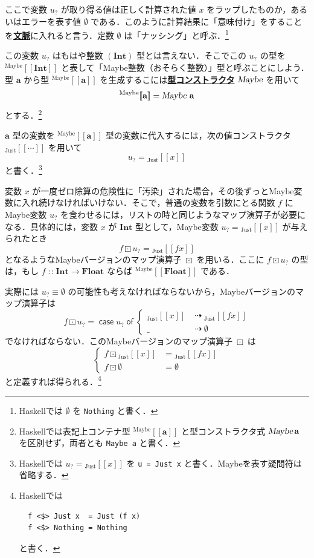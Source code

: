\documentclass[a5paper,twoside,fleqn,draft]{jsbook}
\def\[{[\![}
\def\]{]\!]}
\newcommand{\programminglanguage}[1]{\textsf{#1}}
\newcommand{\haskell}{\programminglanguage{Haskell}}
\newcommand{\keyword}[1]{{\underline{\textbf{#1}}}}
\newcommand{\code}[1]{\texttt{#1}}
\newcommand{\mKeyword}[1]{\mathsf{#1}}
\newcommand{\mCaseKeyword}{\mKeyword{case}}
\newcommand{\mOfKeyword}{\mKeyword{of}}
\DeclareMathOperator{\mCaseKW}{\mCaseKeyword}
\DeclareMathOperator{\mOfKW}{\mOfKeyword}
\newcommand{\mNothing}{\emptyset}
\DeclareMathOperator{\mFuncArrow}{\rightarrow}
\DeclareMathOperator{\mIfSo}{\dashrightarrow}
\DeclareMathOperator{\mIn}{{:\!:}}
\DeclareMathOperator{\mMapMaybe}{\boxdot}
\newcommand{\mType}[1]{\mathbf{#1}} %
\newcommand{\mA}{\mType{a}}
\newcommand{\mFloatType}{\mType{Float}}
\newcommand{\mIntType}{\mType{Int}}
\newcommand{\mTypeAssemble}[2]{{}^\mathrm{#1}\[\mType{#2}\]}
\newcommand{\mMaybeType}[1]{\mTypeAssemble{Maybe}{#1}}
\newcommand{\mTypeConstructor}[1]{\textsl{#1}}
\DeclareMathOperator{\mMaybeTypeConstructor}{\mTypeConstructor{Maybe}}
\newcommand{\mValueConstructor}[1]{\mathrm{#1}}
\newcommand{\mValueWith}[2]{{}_\mValueConstructor{#1}\[#2\]}
\newcommand{\mJustWith}[1]{\mValueWith{Just}{#1}}
\newcommand{\mMaybe}[1]{{#1}_?}
\newcommand{\mCaseOf}[1]{\mCaseKW#1\mOfKW}
\newcommand{\mProjEXP}[2]{#1\mFuncArrow#2} %
\begin{document}
ここで変数 $\mMaybe{u}$ が取り得る値は正しく計算された値 $x$ をラップしたものか，あるいはエラーを表す値 $\mNothing$ である．このように計算結果に「意味付け」をすることを\keyword{文脈}に入れると言う．定数 $\mNothing$ は「ナッシング」と呼ぶ．\footnote{\haskell では $\mNothing$ を \code{Nothing} と書く．}

この変数 $\mMaybe{u}$ はもはや整数 $(\mIntType)$ 型とは言えない．そこでこの $\mMaybe{u}$ の型を $\mMaybeType{\mIntType}$ と表して「Maybe整数（おそらく整数）」型と呼ぶことにしよう．型 $\mA $ から型 $\mMaybeType{a}$ を生成するこには\keyword{型コンストラクタ} $\mMaybeTypeConstructor$ を用いて
\begin{equation}
  \mMaybeType{a}
  =\mMaybeTypeConstructor\,\mA
\end{equation}
とする．\footnote{\haskell では表記上コンテナ型 $\mMaybeType{a}$ と型コンストラクタ式 $\mMaybeTypeConstructor\mA$ を区別せず，両者とも \code{Maybe a} と書く．}

$\mA $ 型の変数を $\mMaybeType{a}$ 型の変数に代入するには，次の値コンストラクタ $\mJustWith{\dotsb}$ を用いて
\begin{equation}
  \mMaybe{u}
  =\mJustWith{x}
\end{equation}
と書く．\footnote{\haskell では $\mMaybe{u}=\mJustWith{x}$ を \code{u = Just x} と書く．Maybeを表す疑問符は省略する．}

変数 $x$ が一度ゼロ除算の危険性に「汚染」された場合，その後ずっとMaybe変数に入れ続けなければいけない．そこで，普通の変数を引数にとる関数 $f$ にMaybe変数 $\mMaybe{u}$ を食わせるには，リストの時と同じようなマップ演算子が必要になる．具体的には，変数 $x$ が $\mType{Int}$ 型として，Maybe変数 $\mMaybe{u}=\mJustWith{x}$ が与えられたとき
\begin{equation}
  f\mMapMaybe\mMaybe{u}
  =\mJustWith{fx}
\end{equation}
となるようなMaybeバージョンのマップ演算子 $\mMapMaybe$ を用いる．ここに $f\mMapMaybe\mMaybe{u}$ の型は，もし $f\mIn\mProjEXP{\mIntType}{\mFloatType}$ ならば $\mMaybeType{\mFloatType}$ である．

実際には $\mMaybe{u}\equiv\mNothing$ の可能性も考えなければならないから，Maybeバージョンのマップ演算子は
\begin{equation}
  f\mMapMaybe\mMaybe{u}
  =\mCaseOf{\mMaybe{u}}
  \begin{cases}
    \mJustWith{x}
    &\mIfSo\mJustWith{fx}\\
    \_
    &\mIfSo\mNothing
  \end{cases}
\end{equation}
でなければならない．このMaybeバージョンのマップ演算子 $\mMapMaybe$ は
\begin{equation}
  \left\{
  \begin{aligned}
    f\mMapMaybe\mJustWith{x}
    &=\mJustWith{fx}\\
    f\mMapMaybe\mNothing
    &=\mNothing
  \end{aligned}
  \right.
\end{equation}
と定義すれば得られる．\footnote{\haskell では
\begin{verbatim}
  f <$> Just x  = Just (f x)
  f <$> Nothing = Nothing
\end{verbatim}
と書く．}
\end{document}

